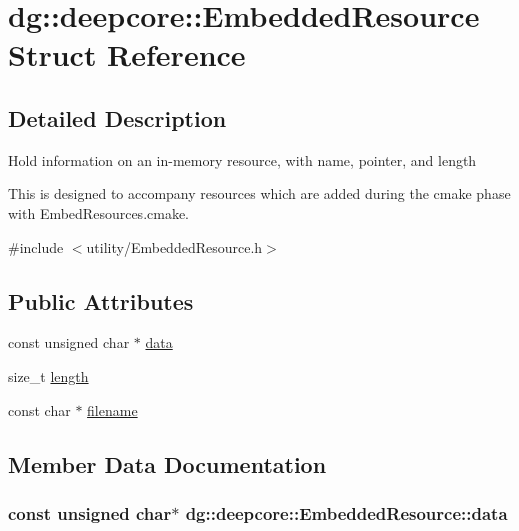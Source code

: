 \hypertarget{structdg_1_1deepcore_1_1_embedded_resource}{}\section{dg\+:\+:deepcore\+:\+:Embedded\+Resource Struct Reference}
\label{structdg_1_1deepcore_1_1_embedded_resource}


\subsection{Detailed Description}
Hold information on an in-\/memory resource, with name, pointer, and length

This is designed to accompany resources which are added during the cmake phase with Embed\+Resources.\+cmake. 

{\ttfamily \#include $<$utility/\+Embedded\+Resource.\+h$>$}

\subsection*{Public Attributes}
\begin{DoxyCompactItemize}
\item 
const unsigned char $\ast$ \hyperlink{structdg_1_1deepcore_1_1_embedded_resource_a6f46534d2ed8e52a2d738e6b23bdc095}{data}
\item 
size\+\_\+t \hyperlink{structdg_1_1deepcore_1_1_embedded_resource_a34bcaf8f6488a7a6922bbdfb1da4a762}{length}
\item 
const char $\ast$ \hyperlink{structdg_1_1deepcore_1_1_embedded_resource_a9ff84df73c72ee45a88daf20a9e90459}{filename}
\end{DoxyCompactItemize}


\subsection{Member Data Documentation}
\subsubsection[{\texorpdfstring{data}{data}}]{\setlength{\rightskip}{0pt plus 5cm}const unsigned char$\ast$ dg\+::deepcore\+::\+Embedded\+Resource\+::data}\hypertarget{structdg_1_1deepcore_1_1_embedded_resource_a6f46534d2ed8e52a2d738e6b23bdc095}{}\label{structdg_1_1deepcore_1_1_embedded_resource_a6f46534d2ed8e52a2d738e6b23bdc095}
